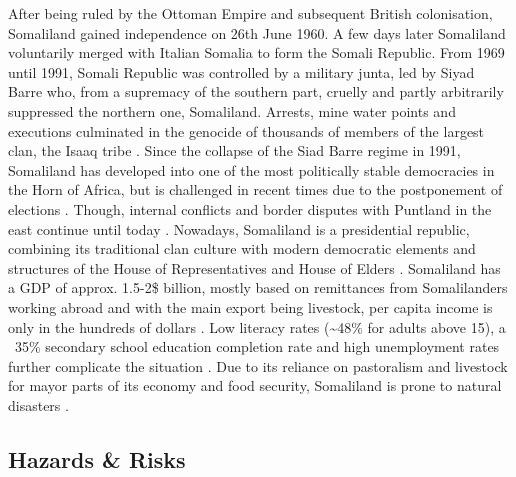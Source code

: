 After being ruled by the Ottoman Empire and subsequent British colonisation, Somaliland gained independence on 26th June 1960. A few days later Somaliland voluntarily merged with Italian Somalia to form the Somali Republic. From 1969 until 1991, Somali Republic was controlled by a military junta, led by Siyad Barre who, from a supremacy of the southern part, cruelly and partly arbitrarily suppressed the northern one, Somaliland. Arrests, mine water points and executions culminated in the genocide of thousands of members of the largest clan, the Isaaq tribe \autocite{peiferStoppingMassKillings2009,republicofsomaliaRepublicSomalilandCountry2021}. Since the collapse of the Siad Barre regime in 1991, Somaliland has developed into one of the most politically stable democracies in the Horn of Africa, but is challenged in recent times due to the postponement of elections \autocite{bbcSomalilandProfile2022, fortiPocketStabilityUnderstanding2011}. Though, internal conflicts and border disputes with Puntland in the east continue until today \autocite{filhoDemocracyAfricaOutstanding2021}. Nowadays, Somaliland is a presidential republic, combining its traditional clan culture with modern democratic elements and structures of the House of Representatives and House of Elders \autocite{salemTerritorialDiagnosticReport2016}.\newline
Somaliland has a GDP of approx. 1.5-2\$ billion, mostly based on remittances from Somalilanders working abroad and with the main export being livestock, per capita income is only in the hundreds of dollars \autocite{klobucistaSomalilandHornAfrica2018, republicofsomaliaRepublicSomalilandCountry2021, worldbankNewWorldBank2014}. Low literacy rates (\~{}48\% for adults above 15), a ~35\% secondary school education completion rate and high unemployment rates further complicate the situation \autocite{republicofsomaliaRepublicSomalilandCountry2021,worldbankNewWorldBank2014}. Due to its reliance on pastoralism and livestock for mayor parts of its economy and food security, Somaliland is prone to natural disasters \autocite{usaidEconomicsResilienceDrought2018}.

\subsection{Hazards \& Risks}

